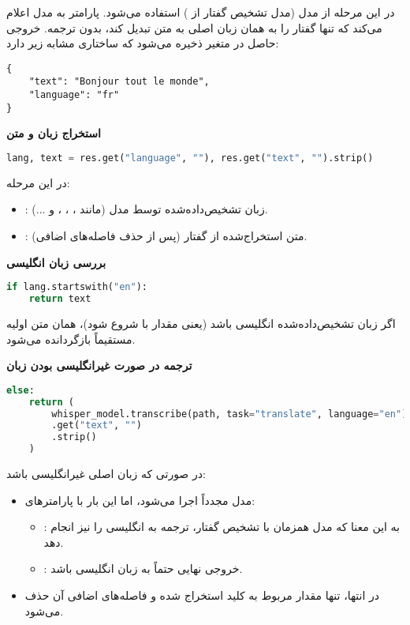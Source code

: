 \documentclass{article}
\begin{document}
در این مرحله از مدل  (مدل تشخیص گفتار از ) استفاده می‌شود.  
پارامتر  به مدل اعلام می‌کند که تنها گفتار را به همان زبان اصلی به متن تبدیل کند، بدون ترجمه.  
خروجی حاصل در متغیر  ذخیره می‌شود که ساختاری مشابه زیر دارد:

\begin{latin}
\begin{lstlisting}
{
    "text": "Bonjour tout le monde",
    "language": "fr"
}
\end{lstlisting}
\end{latin}

\textbf{استخراج زبان و متن}

\begin{latin}
\begin{lstlisting}[language=Python]
lang, text = res.get("language", ""), res.get("text", "").strip()
\end{lstlisting}
\end{latin}

در این مرحله:
\begin{itemize}
    \item {}: زبان تشخیص‌داده‌شده توسط مدل (مانند ، ، ،  و ...).
    \item {}: متن استخراج‌شده از گفتار (پس از حذف فاصله‌های اضافی).
\end{itemize}

\textbf{بررسی زبان انگلیسی}

\begin{latin}
\begin{lstlisting}[language=Python]
if lang.startswith("en"):
    return text
\end{lstlisting}
\end{latin}

اگر زبان تشخیص‌داده‌شده انگلیسی باشد (یعنی مقدار  با  شروع شود)، همان متن اولیه مستقیماً بازگردانده می‌شود.

\textbf{ترجمه در صورت غیرانگلیسی بودن زبان}

\begin{latin}
\begin{lstlisting}[language=Python]
else:
    return (
        whisper_model.transcribe(path, task="translate", language="en")
        .get("text", "")
        .strip()
    )
\end{lstlisting}
\end{latin}

در صورتی که زبان اصلی غیرانگلیسی باشد:
\begin{itemize}
    \item مدل  مجدداً اجرا می‌شود، اما این بار با پارامترهای:
    \begin{itemize}
        \item {}: به این معنا که مدل همزمان با تشخیص گفتار، ترجمه به انگلیسی را نیز انجام دهد.
        \item {}: خروجی نهایی حتماً به زبان انگلیسی باشد.
    \end{itemize}
    \item در انتها، تنها مقدار مربوط به کلید  استخراج شده و فاصله‌های اضافی آن حذف می‌شود.
\end{itemize}
\end{document}
